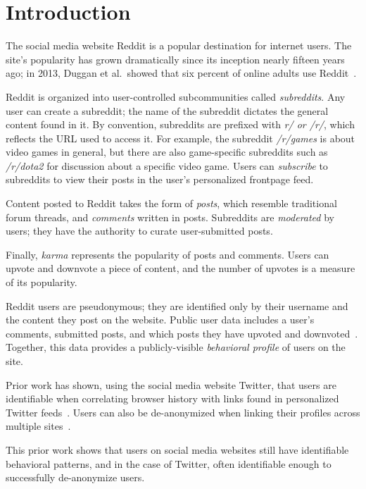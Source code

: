 \documentclass[10pt]{article}
\begin{document}
\section{Introduction}

The social media website Reddit is a popular destination for internet users. The site's popularity has grown dramatically since its inception nearly fifteen years ago; in 2013, Duggan et al.\ showed that six percent of online adults use Reddit~\cite{pewsixpercent}.

Reddit is organized into user-controlled subcommunities called \textit{subreddits}. Any user can create a subreddit; the name of the subreddit dictates the general content found in it. By convention, subreddits are prefixed with \textit{r/ or /r/}, which reflects the URL used to access it. For example, the subreddit \textit{/r/games} is about video games in general, but there are also game-specific subreddits such as \textit{/r/dota2} for discussion about a specific video game. Users can \textit{subscribe} to subreddits to view their posts in the user's personalized frontpage feed.

Content posted to Reddit takes the form of \textit{posts}, which resemble traditional forum threads, and \textit{comments} written in posts. Subreddits are \textit{moderated} by users; they have the authority to curate user-submitted posts.

Finally, \textit{karma} represents the popularity of posts and comments. Users can upvote and downvote a piece of content, and the number of upvotes is a measure of its popularity.

Reddit users are pseudonymous; they are identified only by their username and the content they post on the website. Public user data includes a user's comments, submitted posts, and which posts they have upvoted and downvoted~\cite{redditapi}. Together, this data provides a publicly-visible \textit{behavioral profile} of users on the site.

Prior work has shown, using the social media website Twitter, that users are identifiable when correlating browser history with links found in personalized Twitter feeds~\cite{su2017deanonymizingweb}. Users can also be de-anonymized when linking their profiles across multiple sites~\cite{}\cite{}.

This prior work shows that users on social media websites still have identifiable behavioral patterns, and in the case of Twitter, often identifiable enough to successfully de-anonymize users.
\end{document}
